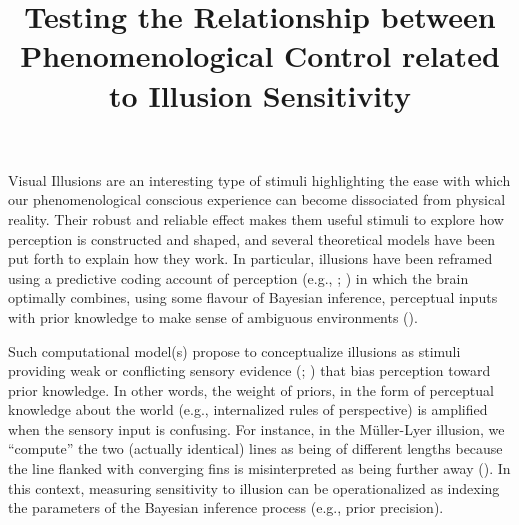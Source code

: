 \documentclass[
  man,
  floatsintext,
  longtable,
  nolmodern,
  notxfonts,
  notimes,
  colorlinks=true,linkcolor=blue,citecolor=blue,urlcolor=blue]{apa7}
\title{Testing the Relationship between Phenomenological Control related
to Illusion Sensitivity}
\affiliation{
{School of Psychology, University of Sussex}}
\newlength{\cslhangindent}
\begin{document}
\maketitle




\setlength\LTleft{0pt}

\resetlinenumber[1]


\ifdefined\Shaded\renewenvironment{Shaded}{\begin{snugshade}\begin{singlespace}}{\end{singlespace}\end{snugshade}}\fi

\setlength{\cslhangindent}{0.5in}

Visual Illusions are an interesting type of stimuli highlighting the
ease with which our phenomenological conscious experience can become
dissociated from physical reality. Their robust and reliable effect
makes them useful stimuli to explore how perception is constructed and
shaped, and several theoretical models have been put forth to explain
how they work. In particular, illusions have been reframed using a
predictive coding account of perception (e.g.,
;
) in which the
brain optimally combines, using some flavour of Bayesian inference,
perceptual inputs with prior knowledge to make sense of ambiguous
environments ().

Such computational model(s) propose to conceptualize illusions as
stimuli providing weak or conflicting sensory evidence
(;
) that
bias perception toward prior knowledge. In other words, the weight of
priors, in the form of perceptual knowledge about the world (e.g.,
internalized rules of perspective) is amplified when the sensory input
is confusing. For instance, in the Müller-Lyer illusion, we ``compute''
the two (actually identical) lines as being of different lengths because
the line flanked with converging fins is misinterpreted as being further
away (). In this
context, measuring sensitivity to illusion can be operationalized as
indexing the parameters of the Bayesian inference process (e.g., prior
precision).
\end{document}
